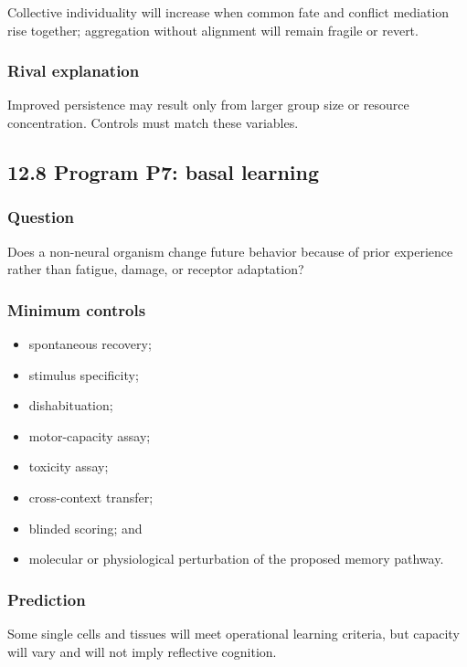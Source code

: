 \documentclass[
  11pt,
]{article}
\providecommand{\tightlist}{%
  \setlength{\itemsep}{0pt}\setlength{\parskip}{0pt}}
\begin{document}
Collective individuality will increase when common fate and conflict
mediation rise together; aggregation without alignment will remain
fragile or revert.

\subsubsection{Rival explanation}\label{rival-explanation}

Improved persistence may result only from larger group size or resource
concentration. Controls must match these variables.

\subsection{12.8 Program P7: basal
learning}\label{program-p7-basal-learning}

\subsubsection{Question}\label{question-6}

Does a non-neural organism change future behavior because of prior
experience rather than fatigue, damage, or receptor adaptation?

\subsubsection{Minimum controls}\label{minimum-controls}

\begin{itemize}
\tightlist
\item
  spontaneous recovery;
\item
  stimulus specificity;
\item
  dishabituation;
\item
  motor-capacity assay;
\item
  toxicity assay;
\item
  cross-context transfer;
\item
  blinded scoring; and
\item
  molecular or physiological perturbation of the proposed memory
  pathway.
\end{itemize}

\subsubsection{Prediction}\label{prediction-2}

Some single cells and tissues will meet operational learning criteria,
but capacity will vary and will not imply reflective cognition.
\end{document}
